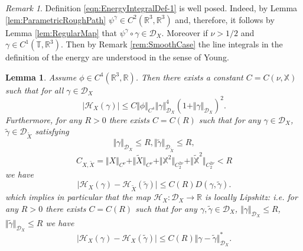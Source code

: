 \documentclass[11pt,a4paper,reqno]{amsart}%
\theoremstyle{plain}
\theoremstyle{remark}
\newtheorem{remark}[theorem]{Remark}
\theoremstyle{plain}
\newtheorem{lemma}[theorem]{Lemma}
\numberwithin{equation}{section}
\def\Rnu{{\mathbb R}}
\begin{document}
\begin{remark}\label{rem:CorrectEnergyDef}
Definition
\eqref{eqn:EnergyIntegralDef-1}
is well posed. Indeed, by Lemma \ref{lem:ParametricRoughPath}
$\psi^{\gamma}\in C^2(\Rnu^3,\Rnu^3)$ and, therefore, it
follows by Lemma \ref{lem:RegularMap} that
$\psi^{\gamma} \circ\gamma\in \mathcal{D}_X$.
Moreover if $\nu>{1}/{2}$ and $\gamma\in C^1(\mathbb{T},\Rnu^3)$.
Then by Remark \ref{rem:SmoothCase} the line integrals in the
definition of the energy are understood in the sense of Young.
\end{remark}
\begin{lemma}\label{lem:EnergyProperties}
Assume $\phi\in C^4(\Rnu^3,\Rnu)$. Then there exists a constant
$C=C(\nu,\mathbb{X})$ such that for all $\gamma\in \mathcal{D}_X$
\begin{equation}
\vert \mathcal{H}_X(\gamma)\vert \leq
C\Vert \phi\Vert_{C^4}\Vert \gamma\Vert_{\mathcal{D}_X}^4(1+\Vert \gamma\Vert_{\mathcal{D}_X})^2.\label{eqn:EnergyEstimAbove}
\end{equation}
Furthermore, for any $R>0$ there exists $C=C(R)$ such that for any
$\gamma\in\mathcal{D}_X$,
$\tilde{\gamma}\in\mathcal{D}_{\tilde{X}}$ satisfying
$$
\Vert \gamma\Vert_{\mathcal{D}_X}\leq R,
\Vert \tilde{\gamma}\Vert_{\mathcal{D}_{\tilde{X}}}\leq R,
$$
$$
C_{X,\tilde{X}}=\Vert X\Vert_{C^{\nu}}+\Vert \tilde{X}\Vert_{C^{\nu}}+\Vert \mathbb{X}^2\Vert_{C_2^{2\nu}}+\Vert \mathbb{\tilde{X}}^2\Vert_{C_2^{2\nu}}<R
$$
we have
\begin{equation}
\vert \mathcal{H}_X(\gamma)-\mathcal{H}_{\tilde{X}}(\tilde{\gamma})\vert \leq
C(R)D(\gamma,\tilde{\gamma}).\label{eqn:LocLipshitz-2}
\end{equation}
which implies in particular that the map $\mathcal{H}_X:\mathcal{D}_X\to\Rnu$ is locally
Lipshitz: i.e. for any $R>0$ there exists $C=C(R)$ such that for
any $\gamma,\tilde{\gamma}\in\mathcal{D}_X$,
$\Vert \gamma\Vert_{\mathcal{D}_X}\leq R$, $\Vert \tilde{\gamma}\Vert_{\mathcal{D}_X}\leq R$
we have
\begin{equation}
\vert \mathcal{H}_X(\gamma)-\mathcal{H}_X(\tilde{\gamma})\vert \leq
C(R)\Vert \gamma-\tilde{\gamma}\Vert_{\mathcal{D}_X}^*.\label{eqn:LocLipshitz}
\end{equation}
\end{lemma}
\end{document}
